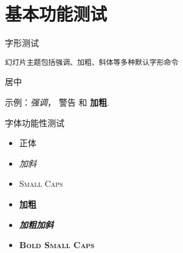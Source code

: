 \documentclass[10pt]{beamer}
\begin{document}
\section{基本功能测试}

\begin{frame}[fragile]{字形测试}
      \begin{verbatim}幻灯片主题包括强调、加粗、斜体等多种默认字形命令\end{verbatim}

  \begin{center}居中\end{center}

 示例：\emph{强调}， \alert{警告} 和 \textbf{加粗}.
\end{frame}

\begin{frame}{字体功能性测试}
  \begin{itemize}
    \item 正体
    \item \textit{加斜}
    \item \textsc{Small Caps}
    \item \textbf{加粗}
    \item \textbf{\textit{加粗加斜}}
    \item \textbf{\textsc{Bold Small Caps}}
  \end{itemize}
\end{frame}
\end{document}
